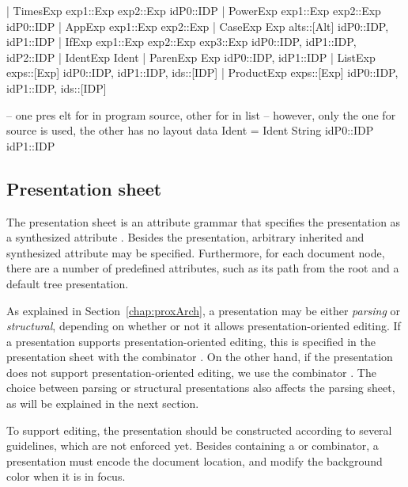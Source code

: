 \bc
         | TimesExp  exp1::Exp exp2::Exp                     { idP0::IDP }
         | PowerExp exp1::Exp exp2::Exp                      { idP0::IDP }
         | AppExp exp1::Exp exp2::Exp                        { }
         | CaseExp Exp alts::[Alt]                          { idP0::IDP, idP1::IDP }
         | IfExp exp1::Exp exp2::Exp exp3::Exp                { idP0::IDP, idP1::IDP, idP2::IDP }
         | IdentExp Ident                                  { }
         | ParenExp Exp                                    { idP0::IDP, idP1::IDP }
         | ListExp exps::[Exp]                              { idP0::IDP, idP1::IDP, ids::[IDP] }
         | ProductExp exps::[Exp]                           { idP0::IDP, idP1::IDP, ids::[IDP] }

-- one pres elt for in program source, other for in list
-- however, only the one for source is used, the other has no layout
data Ident = Ident String                                 { idP0::IDP idP1::IDP }

\ec

\subsection{Presentation sheet}

The presentation sheet is an attribute grammar that specifies the presentation as a synthesized attribute . Besides the presentation, arbitrary inherited and synthesized attribute may be specified. Furthermore, for each document node, there are a number of predefined attributes, such as its path from the root and a default tree presentation.


As explained in Section~\ref{chap:proxArch}, a presentation may be either {\em parsing} or {\em structural}, depending on whether or not it allows presentation-oriented editing. If a presentation supports presentation-oriented editing, this is specified in the presentation sheet with the combinator . On the other hand, if the presentation does not support presentation-oriented editing, we use the combinator .  The choice between parsing or structural presentations also affects the parsing sheet, as will be explained in the next section. 

To support editing, the presentation should be constructed according to several guidelines, which are not enforced yet. Besides containing a  or  combinator, a presentation must encode the document location, and modify the background color when it is in focus. 

